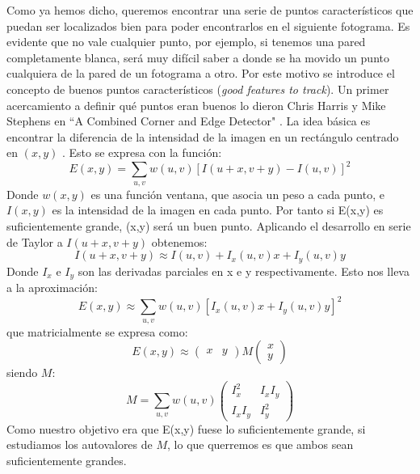 \documentclass[a4paper,openright, 12pt]{book}
\begin{document}
Como ya hemos dicho, queremos encontrar una serie de puntos característicos que puedan ser localizados bien para poder encontrarlos en el siguiente fotograma. Es evidente que no vale cualquier punto, por ejemplo, si tenemos una pared completamente blanca, será muy difícil saber a donde se ha movido un punto cualquiera de la pared de un fotograma a otro. Por este motivo se introduce el concepto de buenos puntos característicos
(\textit{good features to track}).
Un primer acercamiento a definir qué puntos eran buenos lo dieron Chris Harris y Mike Stephens en ``A Combined Corner and Edge Detector" \cite{harris88}.
La idea básica es encontrar la diferencia de la intensidad de la imagen en un rectángulo centrado en $(x,y)$ . Esto se expresa con la función:
\begin{equation}
E(x,y)= \sum_{u,v} w(u,v) [I(u+x,v+y)-I(u,v)]^2
\end{equation}
Donde $w(x,y)$ es una función ventana, que asocia un peso a cada punto, e $I(x,y)$ es la intensidad de la imagen en cada punto.
Por tanto si E(x,y) es suficientemente grande, (x,y) será un buen punto.
Aplicando el desarrollo en serie de Taylor a $I(u+x,v+y)$ obtenemos:
\begin{equation}
I(u+x,v+y) \approx I(u, v) + I_x(u,v)x + I_y(u,v)y
\end{equation}
Donde $I_x$ e $I_y$ son las derivadas parciales en x e y respectivamente.
Esto nos lleva a la aproximación:
\begin{equation*}
E(x,y) \approx \sum_{u,v} w(u,v)[I_x(u,v)x + I_y(u,v)y]^2
\end{equation*}
que matricialmente se expresa como:
\begin{equation}
E(x,y) \approx 
\left( \begin{array}{cc}x & y \end{array} \right)
M 
\left( \begin{array}{c}x\\y \end{array} \right)
\end{equation}
siendo $M$:
\begin{equation*}
M = \sum_{u,v}w(u,v)
\left( \begin{array}{cc}
I_x^2 & I_xI_y\\
I_xI_y & I_y^2
 \end{array} \right)
\end{equation*}
Como nuestro objetivo era que E(x,y) fuese lo suficientemente grande, si estudiamos los autovalores de $M$, lo que querremos es que ambos sean suficientemente grandes.
\end{document}
